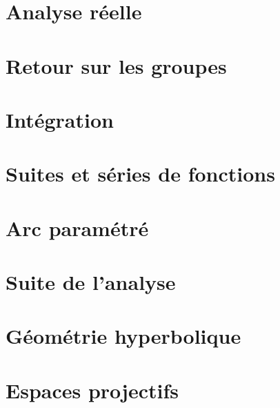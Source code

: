 \chapter{Analyse réelle}









\chapter{Retour sur les groupes}





\chapter{Intégration}









\chapter{Suites et séries de fonctions}




\chapter{Arc paramétré}



\chapter{Suite de l'analyse}





\chapter{Géométrie hyperbolique}


\chapter{Espaces projectifs}




